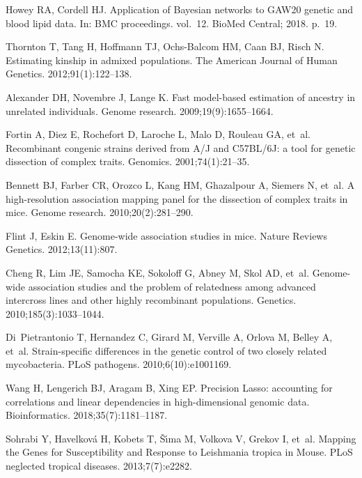 \documentclass[10pt,letterpaper]{article}
\begin{document}
\begin{thebibliography}{10}
	Howey RA, Cordell HJ.
	\newblock Application of Bayesian networks to GAW20 genetic and blood lipid
	data.
	\newblock In: BMC proceedings. vol.~12. BioMed Central; 2018. p.~19.

	Thornton T, Tang H, Hoffmann TJ, Ochs-Balcom HM, Caan BJ, Risch N.
	\newblock Estimating kinship in admixed populations.
	\newblock The American Journal of Human Genetics. 2012;91(1):122--138.

	Alexander DH, Novembre J, Lange K.
	\newblock Fast model-based estimation of ancestry in unrelated individuals.
	\newblock Genome research. 2009;19(9):1655--1664.

	Fortin A, Diez E, Rochefort D, Laroche L, Malo D, Rouleau GA, et~al.
	\newblock Recombinant congenic strains derived from A/J and C57BL/6J: a tool
	for genetic dissection of complex traits.
	\newblock Genomics. 2001;74(1):21--35.

	Bennett BJ, Farber CR, Orozco L, Kang HM, Ghazalpour A, Siemers N, et~al.
	\newblock A high-resolution association mapping panel for the dissection of
	complex traits in mice.
	\newblock Genome research. 2010;20(2):281--290.

	Flint J, Eskin E.
	\newblock Genome-wide association studies in mice.
	\newblock Nature Reviews Genetics. 2012;13(11):807.

	Cheng R, Lim JE, Samocha KE, Sokoloff G, Abney M, Skol AD, et~al.
	\newblock Genome-wide association studies and the problem of relatedness among
	advanced intercross lines and other highly recombinant populations.
	\newblock Genetics. 2010;185(3):1033--1044.

	Di~Pietrantonio T, Hernandez C, Girard M, Verville A, Orlova M, Belley A,
	et~al.
	\newblock Strain-specific differences in the genetic control of two closely
	related mycobacteria.
	\newblock PLoS pathogens. 2010;6(10):e1001169.

	Wang H, Lengerich BJ, Aragam B, Xing EP.
	\newblock Precision Lasso: accounting for correlations and linear dependencies
	in high-dimensional genomic data.
	\newblock Bioinformatics. 2018;35(7):1181--1187.

	Sohrabi Y, Havelkov{\'a} H, Kobets T, {\v{S}}{\'\i}ma M, Volkova V, Grekov I,
	et~al.
	\newblock Mapping the Genes for Susceptibility and Response to Leishmania
	tropica in Mouse.
	\newblock PLoS neglected tropical diseases. 2013;7(7):e2282.


\end{thebibliography}
\end{document}
